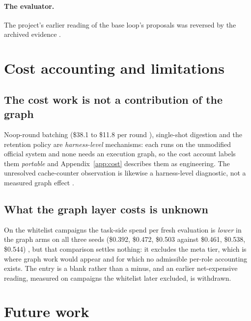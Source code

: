 \paragraph{The evaluator.} The project's earlier reading of the base
loop's proposals was reversed by the archived evidence .

\section{Cost accounting and limitations}
\label{sec:cost}

\subsection*{The cost work is not a contribution of the graph}

Noop-round batching (\$38.1 to \$11.8 per round ), single-shot
digestion and the retention policy are \emph{harness-level} mechanisms:
each runs on the unmodified official system and none needs an execution
graph, so the cost account labels them \emph{portable}  and
Appendix~\ref{app:cost} describes them as engineering. The unresolved
cache-counter observation is likewise a harness-level diagnostic, not a
measured graph effect .

\subsection*{What the graph layer costs is unknown}

On the whitelist campaigns the task-side spend per fresh evaluation is
\emph{lower} in the graph arms on all three seeds (\$0.392, \$0.472,
\$0.503 against \$0.461, \$0.538, \$0.544) , but that comparison
settles nothing: it excludes the meta tier, which is where graph work would
appear and for which no admissible per-role accounting exists. The entry is
a blank rather than a minus, and an earlier net-expensive reading, measured
on campaigns the whitelist later excluded, is withdrawn.

\section{Future work}
\label{sec:future}

